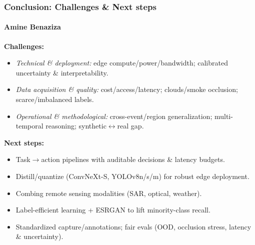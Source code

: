 \documentclass{beamer}
\newcommand{\namedframe}[3]{
  \begin{frame}
    \frametitle{#2}
    \framesubtitle{#1}
    #3
  \end{frame}
}
\begin{document}
\namedframe{Amine Benaziza}{Conclusion: Challenges \& Next steps}{
\footnotesize
\textbf{Challenges:}
\begin{itemize}
  \item \textit{Technical \& deployment:} edge compute/power/bandwidth; calibrated uncertainty \& interpretability.
  \item \textit{Data acquisition \& quality:} cost/access/latency; clouds/smoke occlusion; scarce/imbalanced labels.
  \item \textit{Operational \& methodological:} cross-event/region generalization; multi-temporal reasoning; synthetic$\leftrightarrow$real gap.
\end{itemize}
\textbf{Next steps:}
\begin{itemize}
  \item Task$\to$action pipelines with auditable decisions \& latency budgets.
  \item Distill/quantize (ConvNeXt-S, YOLOv8n/s/m) for robust edge deployment.
  \item Combing remote sensing modalities (SAR, optical, weather).
  \item Label-efficient learning + ESRGAN to lift minority-class recall.
  \item Standardized capture/annotations; fair evals (OOD, occlusion stress, latency \& uncertainty).
\end{itemize}
}
\end{document}
